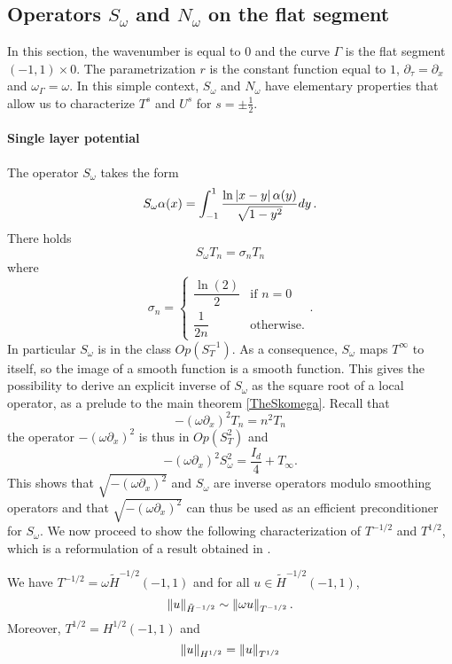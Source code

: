 \documentclass[a4paper]{article}
\begin{document}
\subsection{Operators $S_\omega$ and $N_\omega$ on the flat segment}

In this section, the wavenumber is equal to $0$ and the curve $\Gamma$ is the flat segment $(-1,1)\times{0}$. The parametrization $r$ is the constant function equal to $1$, $\partial_\tau = \partial_x$ and $\omega_\Gamma = \omega$. In this simple context, $S_\omega$ and $N_\omega$ have elementary properties that allow us to characterize $T^{s}$ and $U^s$ for $s = \pm \frac{1}{2}$. 

\paragraph{Single layer potential} The operator $S_\omega$ takes the form 
\[S_\omega \alpha(x) = \int_{-1}^{1} \frac{\ln \left\lvert x - y \right\rvert \alpha(y)}{\sqrt{1 - y^2}}dy \,.\]
There holds 
\begin{equation}
	\label{explicitEigs}
	S_\omega T_n = \sigma_n T_n
\end{equation}
where 
\[\sigma_n = \begin{cases}
\dfrac{\ln(2)}{2} & \text{if } n=0\\
\dfrac{1}{2n} & \text{otherwise}.
\end{cases}.\]
In particular $S_\omega$ is in the class $\textit{Op}(S^{-1}_T)$. As a consequence, $S_\omega$ maps $T^{\infty}$ to itself, so the image of a smooth function is a smooth function. This gives the possibility to derive an explicit inverse of $S_\omega$ as the square root of a local operator, as a prelude to the main theorem \autoref{TheSkomega}. Recall that
\[-(\omega \partial_x)^2 T_n = n^2 T_n\]
the operator $-(\omega \partial_x)^2$ is thus in $\textit{Op}(S^{2}_T)$ and 
\begin{equation}
\label{prelude1}
	-(\omega \partial_x)^2 S_\omega^2 = \frac{I_d}{4} + T_\infty.
\end{equation}
This shows that $\sqrt{-(\omega \partial_x)^2}$ and $S_\omega$ are inverse operators modulo smoothing operators and that $\sqrt{-(\omega \partial_x)^2}$ can thus be used as an efficient preconditioner for $S_\omega$.  
We now proceed to show the following characterization of $T^{-1/2}$ and $T^{1/2}$, which is a reformulation of a result obtained in \cite{jerez2012explicit} .
\begin{Lem}
	\label{LemmaT-1/2}
	We have $T^{-1/2} = \omega\tilde{H}^{-1/2}(-1,1)$ and for all $u \in \tilde{H}^{-1/2}(-1,1)$,
	\[\left\|u\right\|_{\tilde{H}^{-1/2}} \sim \left\|\omega u\right\|_{T^{-1/2}}.\] 
	Moreover, $T^{1/2} = H^{1/2}(-1,1)$ and 
	\[\left\|u\right\|_{H^{1/2}} = \left\|u\right\|_{T^{1/2}}\]
\end{Lem}
\end{document}

